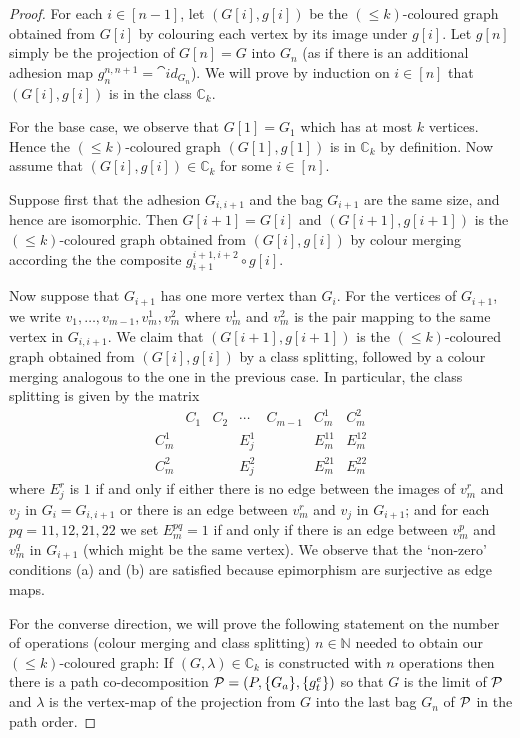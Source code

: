 \begin{proof}
    For each $i\in [n-1]$, let $(G[i],g[i])$ be the $(\le k)$-coloured graph obtained from $G[i]$ by colouring each vertex by its image under $g[i]$. Let $g[n]$ simply be the projection of $G[n]=G$ into $G_n$ (as if there is an additional adhesion map $g_{n}^{n,n+1}=\cat{id}_{G_n}$). We will prove by induction on $i\in[n]$ that $(G[i],g[i])$ is in the class $\mathbb{C}_k$.

    For the base case, we observe that $G[1]=G_1$ which has at most $k$ vertices. Hence the $(\le k)$-coloured graph $(G[1],g[1])$ is in $\mathbb{C}_k$ by definition. Now assume that $(G[i],g[i])\in \mathbb{C}_k$ for some $i\in[n]$.

    Suppose first that the adhesion $G_{i,i+1}$ and the bag $G_{i+1}$ are the same size, and hence are isomorphic. Then $G[i+1]=G[i]$ and $(G[i+1],g[i+1])$ is the $(\le k)$-coloured graph obtained from $(G[i],g[i])$ by colour merging according the the composite $g_{i+1}^{i+1,i+2}\circ g[i]$.
    
    Now suppose that $G_{i+1}$ has one more vertex than $G_i$. For the vertices of $G_{i+1}$, we write $v_1,\ldots,v_{m-1},v_m^1,v_m^2$ where $v_m^1$ and $v_m^2$ is the pair mapping to the same vertex in $G_{i,i+1}$.
    We claim that $(G[i+1],g[i+1])$ is the $(\le k)$-coloured graph obtained from $(G[i],g[i])$ by a class splitting, followed by a colour merging analogous to the one in the previous case. In particular, the class splitting is given by the matrix 
    \[
    \begin{array}{c|cccc|cc}
        & C_1 & C_2 & \cdots & C_{m-1} & C_m^1 & C_m^2  \\
        \hline
        C_m^1   &  &  & E_j^{1} &  & E_{m}^{11} & E_m^{12}  \\
        C_m^2  &  &  & E_j^{2}  &  & E_m^{21} & E_m^{22} 
    \end{array}
    \]
    where $E_j^r$ is $1$ if and only if either there is no edge between the images of $v_m^r$ and $v_j$ in $G_i=G_{i,i+1}$ or there is an edge between $v_m^r$ and $v_j$ in $G_{i+1}$; and for each $pq=11,12,21,22$ we set $E_m^{pq}=1$ if and only if there is an edge between $v_m^p$ and $v_m^q$ in $G_{i+1}$ (which might be the same vertex). We observe that the `non-zero' conditions (a) and (b) are satisfied because epimorphism are surjective as edge maps.

    For the converse direction, we will prove the following statement on the number of operations (colour merging and class splitting) $n\in\mathbb{N}$ needed to obtain our $(\le k)$-coloured graph: If $(G,\lambda)\in\mathbb{C}_k$ is constructed with $n$ operations then there is a path co-decomposition $\operatorname{\mathcal{P}}=(P,\{G_a\},\{g_t^e\})$ so that $G$ is the limit of $\operatorname{\mathcal{P}}$ and $\lambda$ is the vertex-map of the projection from $G$ into the last bag $G_n$ of $\operatorname{\mathcal{P}}$ in the path order.


\end{proof}
